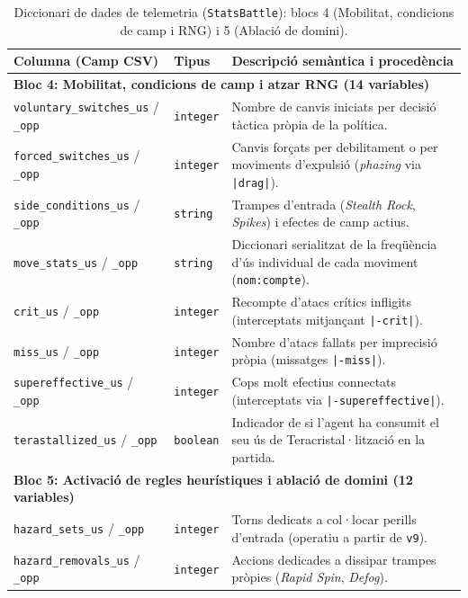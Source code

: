 \begin{table}[htbp]
\centering
\caption{Diccionari de dades de telemetria (\texttt{StatsBattle}): blocs 4 (Mobilitat, condicions de camp i RNG) i 5 (Ablació de domini).}
\label{tab:app_telemetry_part2}
\footnotesize
\renewcommand{\arraystretch}{1.12}
\begin{tabularx}{\textwidth}{lp{1.8cm}>{\raggedright\arraybackslash}X}
\toprule
\textbf{Columna (Camp CSV)} & \textbf{Tipus} & \textbf{Descripció semàntica i procedència} \\
\midrule
\multicolumn{3}{l}{\textbf{Bloc 4: Mobilitat, condicions de camp i atzar RNG (14 variables)}} \\
\midrule
\texttt{voluntary\_switches\_us} / \texttt{\_opp} & \texttt{integer} & Nombre de canvis iniciats per decisió tàctica pròpia de la política. \\
\texttt{forced\_switches\_us} / \texttt{\_opp} & \texttt{integer} & Canvis forçats per debilitament o per moviments d'expulsió (\emph{phazing} via \texttt{|drag|}). \\
\texttt{side\_conditions\_us} / \texttt{\_opp} & \texttt{string} & Trampes d'entrada (\emph{Stealth Rock}, \emph{Spikes}) i efectes de camp actius. \\
\texttt{move\_stats\_us} / \texttt{\_opp} & \texttt{string} & Diccionari serialitzat de la freqüència d'ús individual de cada moviment (\texttt{nom:compte}). \\
\texttt{crit\_us} / \texttt{\_opp} & \texttt{integer} & Recompte d'atacs crítics infligits (interceptats mitjançant \texttt{|-crit|}). \\
\texttt{miss\_us} / \texttt{\_opp} & \texttt{integer} & Nombre d'atacs fallats per imprecisió pròpia (missatges \texttt{|-miss|}). \\
\texttt{supereffective\_us} / \texttt{\_opp} & \texttt{integer} & Cops molt efectius connectats (interceptats via \texttt{|-supereffective|}). \\
\texttt{terastallized\_us} / \texttt{\_opp} & \texttt{boolean} & Indicador de si l'agent ha consumit el seu ús de Teracristal·lització en la partida. \\
\midrule
\multicolumn{3}{l}{\textbf{Bloc 5: Activació de regles heurístiques i ablació de domini (12 variables)}} \\
\midrule
\texttt{hazard\_sets\_us} / \texttt{\_opp} & \texttt{integer} & Torns dedicats a col·locar perills d'entrada (operatiu a partir de \texttt{v9}). \\
\texttt{hazard\_removals\_us} / \texttt{\_opp} & \texttt{integer} & Accions dedicades a dissipar trampes pròpies (\emph{Rapid Spin}, \emph{Defog}). \\

\end{tabularx}
\end{table}
